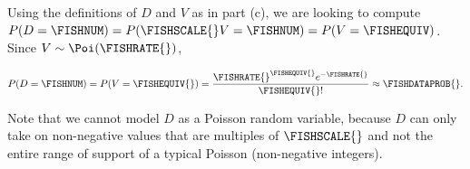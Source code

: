 Using the definitions of $D$ and $V$ as in part (c), we are looking to compute $P(D = \FISHNUM) = P(\FISHSCALE{}V = \FISHNUM) = P(V = \FISHEQUIV)$. Since $V\sim\Poi(\FISHRATE{})$,

\[P(D = \FISHNUM) = P(V = \FISHEQUIV{}) = \dfrac{\FISHRATE{}^{\FISHEQUIV{}} e^{-\FISHRATE{}}}{\FISHEQUIV{}!} \approx \FISHDATAPROB{}.\]

Note that we cannot model $D$ as a Poisson random variable, because $D$ can only take on non-negative values that are multiples of $\FISHSCALE{}$ and not the entire range of support of a typical Poisson (non-negative integers).